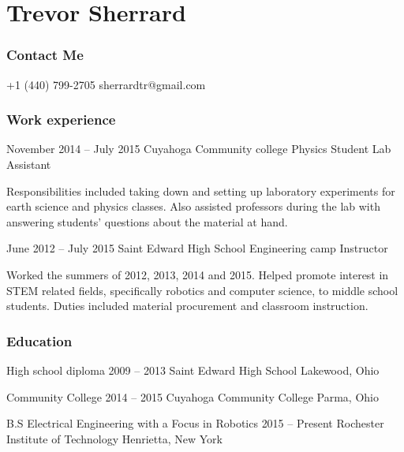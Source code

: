 \documentclass{tccv}
\begin{document}
\part{Trevor Sherrard}
\section{Contact Me}
\begin{eventlist}
    {+1 (440) 799-2705}
    {sherrardtr@gmail.com}
\end{eventlist}

\section{Work experience}

\begin{eventlist}

\item{November 2014 -- July 2015}
     {Cuyahoga Community college}
     {Physics Student Lab Assistant }

Responsibilities included taking down and setting up laboratory experiments for earth science and physics classes. Also assisted professors during the lab with answering students' questions about the material at hand.

\item{June 2012 -- July 2015}
     {Saint Edward High School}
     {Engineering camp Instructor}
     
Worked the summers of 2012, 2013, 2014 and 2015. Helped promote interest in STEM related fields, specifically robotics and computer science, to middle school students. Duties included material procurement and classroom instruction.
\end{eventlist}

\section{Education}

\begin{yearlist}

\item[High school diploma]{2009 -- 2013}
     {Saint Edward High School}
     {Lakewood, Ohio}

\item[Community College]{2014 -- 2015}
     {Cuyahoga Community College}
     {Parma, Ohio}

\item[B.S Electrical Engineering with a Focus in Robotics]{2015 -- Present}
     {Rochester Institute of Technology}
     {Henrietta, New York}

\end{yearlist}
\newline
\newline
\newline
\newline
\newline
\newline
\newline
\end{document}
